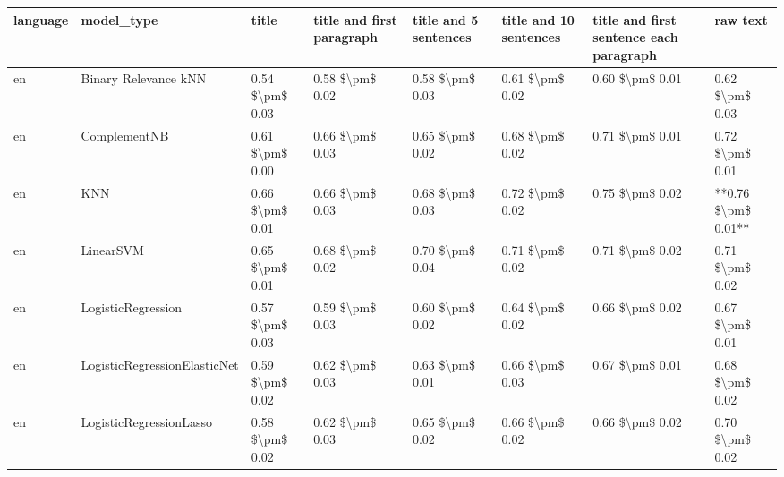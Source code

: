 \begin{tabular}{llllllll}
\toprule
language &                      model\_type &               title & title and first paragraph & title and 5 sentences & title and 10 sentences & title and first sentence each paragraph &            raw text \\
\midrule
      en &            Binary Relevance kNN &     0.54 \$\textbackslash pm\$ 0.03 &           0.58 \$\textbackslash pm\$ 0.02 &       0.58 \$\textbackslash pm\$ 0.03 &        0.61 \$\textbackslash pm\$ 0.02 &                         0.60 \$\textbackslash pm\$ 0.01 &     0.62 \$\textbackslash pm\$ 0.03 \\
      en &                    ComplementNB &     0.61 \$\textbackslash pm\$ 0.00 &           0.66 \$\textbackslash pm\$ 0.03 &       0.65 \$\textbackslash pm\$ 0.02 &        0.68 \$\textbackslash pm\$ 0.02 &                         0.71 \$\textbackslash pm\$ 0.01 &     0.72 \$\textbackslash pm\$ 0.01 \\
      en &                             KNN &     0.66 \$\textbackslash pm\$ 0.01 &           0.66 \$\textbackslash pm\$ 0.03 &       0.68 \$\textbackslash pm\$ 0.03 &        0.72 \$\textbackslash pm\$ 0.02 &                         0.75 \$\textbackslash pm\$ 0.02 & **0.76 \$\textbackslash pm\$ 0.01** \\
      en &                       LinearSVM &     0.65 \$\textbackslash pm\$ 0.01 &           0.68 \$\textbackslash pm\$ 0.02 &       0.70 \$\textbackslash pm\$ 0.04 &        0.71 \$\textbackslash pm\$ 0.02 &                         0.71 \$\textbackslash pm\$ 0.02 &     0.71 \$\textbackslash pm\$ 0.02 \\
      en &              LogisticRegression &     0.57 \$\textbackslash pm\$ 0.03 &           0.59 \$\textbackslash pm\$ 0.03 &       0.60 \$\textbackslash pm\$ 0.02 &        0.64 \$\textbackslash pm\$ 0.02 &                         0.66 \$\textbackslash pm\$ 0.02 &     0.67 \$\textbackslash pm\$ 0.01 \\
      en &    LogisticRegressionElasticNet &     0.59 \$\textbackslash pm\$ 0.02 &           0.62 \$\textbackslash pm\$ 0.03 &       0.63 \$\textbackslash pm\$ 0.01 &        0.66 \$\textbackslash pm\$ 0.03 &                         0.67 \$\textbackslash pm\$ 0.01 &     0.68 \$\textbackslash pm\$ 0.02 \\
      en &         LogisticRegressionLasso &     0.58 \$\textbackslash pm\$ 0.02 &           0.62 \$\textbackslash pm\$ 0.03 &       0.65 \$\textbackslash pm\$ 0.02 &        0.66 \$\textbackslash pm\$ 0.02 &                         0.66 \$\textbackslash pm\$ 0.02 &     0.70 \$\textbackslash pm\$ 0.02 \\

\end{tabular}
